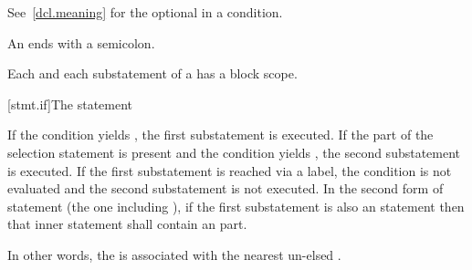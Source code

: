 See~\ref{dcl.meaning} for the optional  in a condition.
\begin{note}
An  ends with a semicolon.
\end{note}

\pnum
{}%
\begin{note}
Each  and
each substatement of a 
has a block scope.
\end{note}

[stmt.if]{The  statement}%

\pnum
If the condition yields , the first
substatement is executed. If the  part of the selection
statement is present and the condition yields , the second
substatement is executed. If the first substatement is reached via a
label, the condition is not evaluated and the second substatement is
not executed. In the second form of  statement
(the one including ), if the first substatement is also an
 statement then that inner  statement shall contain
an  part.
\begin{footnote}
In other words, the  is associated with the nearest un-elsed
.
\end{footnote}

